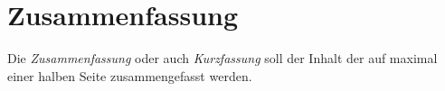 

\chapter*{Zusammenfassung}



Die \emph{Zusammenfassung} oder auch \emph{Kurzfassung} soll der Inhalt der \htlArbeit auf maximal einer halben Seite zusammengefasst werden.